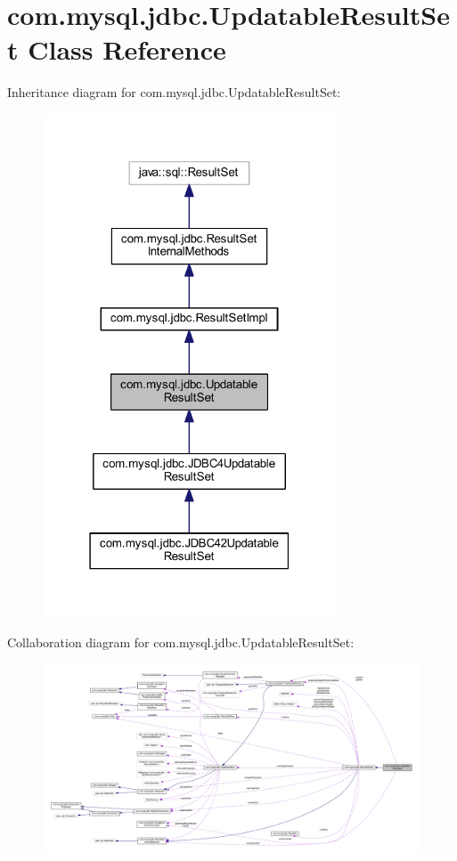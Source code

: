 \hypertarget{classcom_1_1mysql_1_1jdbc_1_1_updatable_result_set}{}\section{com.\+mysql.\+jdbc.\+Updatable\+Result\+Set Class Reference}
\label{classcom_1_1mysql_1_1jdbc_1_1_updatable_result_set}


Inheritance diagram for com.\+mysql.\+jdbc.\+Updatable\+Result\+Set\+:
\nopagebreak
\begin{figure}[H]
\begin{center}
\leavevmode
\includegraphics[width=247pt]{classcom_1_1mysql_1_1jdbc_1_1_updatable_result_set__inherit__graph}
\end{center}
\end{figure}


Collaboration diagram for com.\+mysql.\+jdbc.\+Updatable\+Result\+Set\+:
\nopagebreak
\begin{figure}[H]
\begin{center}
\leavevmode
\includegraphics[width=350pt]{classcom_1_1mysql_1_1jdbc_1_1_updatable_result_set__coll__graph}
\end{center}
\end{figure}
